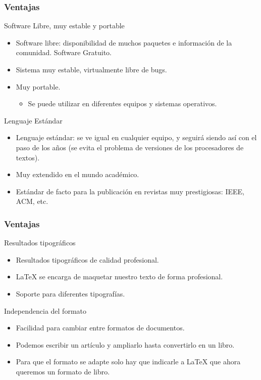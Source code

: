 \documentclass[aspectratio=1610]{beamer}%
\begin{document}
\begin{frame}[fragile]
\frametitle{\textbf{Ventajas}}
\justifying
 \begin{block}{Software Libre, muy estable y portable}
\begin{itemize}\justifying
  \item Software libre: disponibilidad de muchos paquetes e información de la comunidad. Software Gratuito.
  \item Sistema muy estable, virtualmente libre de bugs.
  \item Muy portable.
  \begin{itemize}\justifying
  \item Se puede utilizar en diferentes equipos y sistemas operativos.
\end{itemize}

\end{itemize}

\end{block}
\begin{block}{Lenguaje Estándar}
\begin{itemize}\justifying
  \item Lenguaje estándar: se ve igual en cualquier equipo, y seguirá siendo así con el paso de los años (se evita el problema de versiones de los procesadores de textos).
  \item Muy extendido en el mundo académico.
  \item Estándar de facto para la publicación en revistas muy prestigiosas: IEEE, ACM, etc.
\end{itemize}

\end{block}

\end{frame}

\begin{frame}[fragile]
\frametitle{\textbf{Ventajas}}
\justifying
 \begin{block}{Resultados tipográficos}
\begin{itemize}\justifying
  \item Resultados tipográficos de calidad profesional.
  \item \LaTeX{} se encarga de maquetar nuestro texto de forma profesional.
  \item Soporte para diferentes tipografías.
\end{itemize}

\end{block}
\begin{block}{Independencia del formato}
\begin{itemize}\justifying
  \item Facilidad para cambiar entre formatos de documentos.
  \item Podemos escribir un artículo y ampliarlo hasta convertirlo en un libro.
  \item Para que el formato se adapte solo hay que indicarle a \LaTeX{} que ahora queremos un formato de libro.
\end{itemize}

\end{block}

\end{frame}
\end{document}
